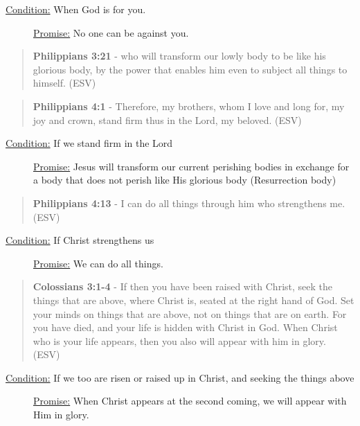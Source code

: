 \documentclass[11pt]{article}
\begin{document}
\begin{description}
\item[{\uline{Condition:} When God is for you.}] \uline{Promise:} No one can be against you.
\end{description}

\begin{quote}
\textbf{Philippians 3:21} - who will transform our lowly body to be like his glorious body, by the power that enables him even to subject all things to himself. (ESV)
\end{quote}

\begin{quote}
\textbf{Philippians 4:1} - Therefore, my brothers, whom I love and long for, my joy and crown, stand firm thus in the Lord, my beloved. (ESV)
\end{quote}

\begin{description}
\item[{\uline{Condition:} If we stand firm in the Lord}] \uline{Promise:} Jesus will transform our current perishing bodies in exchange for a body that does not perish like His glorious body (Resurrection body)
\end{description}

\begin{quote}
\textbf{Philippians 4:13} - I can do all things through him who strengthens me. (ESV)
\end{quote}

\begin{description}
\item[{\uline{Condition:} If Christ strengthens us}] \uline{Promise:} We can do all things.
\end{description}

\begin{quote}
\textbf{Colossians 3:1-4} - If then you have been raised with Christ, seek the things that are above, where Christ is, seated at the right hand of God. Set your minds on things that are above, not on things that are on earth. For you have died, and your life is hidden with Christ in God. When Christ who is your life appears, then you also will appear with him in glory. (ESV)
\end{quote}

\begin{description}
\item[{\uline{Condition:} If we too are risen or raised up in Christ, and seeking the things above}] \uline{Promise:} When Christ appears at the second coming, we will appear with Him in glory.
\end{description}
\end{document}
